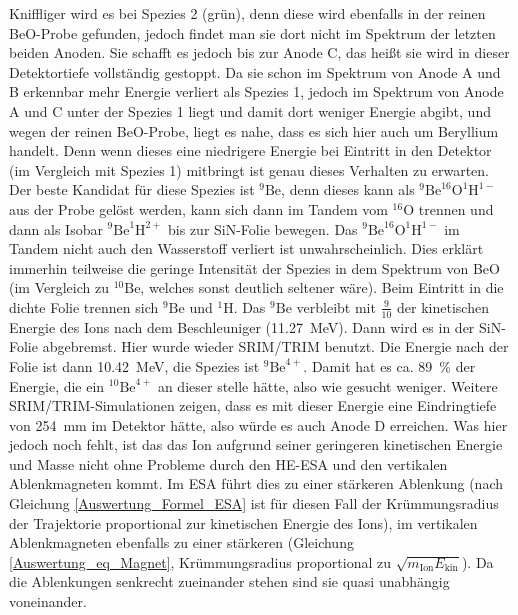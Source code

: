 Kniffliger wird es bei Spezies 2 (grün), denn diese wird ebenfalls in der reinen BeO-Probe gefunden, jedoch findet man sie dort nicht im Spektrum der letzten beiden Anoden.
Sie schafft es jedoch bis zur Anode C, das heißt sie wird in dieser Detektortiefe vollständig gestoppt.
Da sie schon im Spektrum von Anode A und B erkennbar mehr Energie verliert als Spezies 1, jedoch im Spektrum von Anode A und C unter der Spezies 1 liegt und damit dort weniger Energie abgibt, und wegen der reinen BeO-Probe, liegt es nahe, dass es sich hier auch um Beryllium handelt.
Denn wenn dieses eine niedrigere Energie bei Eintritt in den Detektor (im Vergleich mit Spezies 1) mitbringt ist genau dieses Verhalten zu erwarten.
Der beste Kandidat für diese Spezies ist $^{9}\text{Be}$, denn dieses kann als $^{9}\text{Be}^{16}\text{O}^{1}\text{H}^{1-}$ aus der Probe gelöst werden, kann sich dann im Tandem vom $^{16}\text{O}$ trennen und dann als Isobar $^{9}\text{Be}^{1}\text{H}^{2+}$ bis zur SiN-Folie bewegen.
Das $^{9}\text{Be}^{16}\text{O}^{1}\text{H}^{1-}$ im Tandem nicht auch den Wasserstoff verliert ist unwahrscheinlich.
Dies erklärt immerhin teilweise die geringe Intensität der Spezies in dem Spektrum von BeO (im Vergleich zu $^{10}\text{Be}$, welches sonst deutlich seltener wäre).
Beim Eintritt in die dichte Folie trennen sich $^{9}\text{Be}$ und $^{1}\text{H}$.
Das $^{9}\text{Be}$ verbleibt mit $\frac{9}{10}$ der kinetischen Energie des Ions nach dem Beschleuniger (\SI{11.27}{\mega\electronvolt}).
Dann wird es in der SiN-Folie abgebremst.
Hier wurde wieder SRIM/TRIM benutzt.
Die Energie nach der Folie ist dann \SI{10.42}{\mega\electronvolt}, die Spezies ist $^{9}\text{Be}^{4+}$.
Damit hat es ca. \SI{89}{\percent} der Energie, die ein $^{10}\text{Be}^{4+}$ an dieser stelle hätte, also wie gesucht weniger.
Weitere SRIM/TRIM-Simulationen zeigen, dass es mit dieser Energie eine Eindringtiefe von \SI{254}{\milli\metre} im Detektor hätte, also würde es auch Anode D erreichen.
Was hier jedoch noch fehlt, ist das das Ion aufgrund seiner geringeren kinetischen Energie und Masse nicht ohne Probleme durch den HE-ESA und den vertikalen Ablenkmagneten kommt.
Im ESA führt dies zu einer stärkeren Ablenkung (nach Gleichung \ref{Auswertung_Formel_ESA} ist für diesen Fall der Krümmungsradius der Trajektorie proportional zur kinetischen Energie des Ions), im vertikalen Ablenkmagneten ebenfalls zu einer stärkeren (Gleichung \ref{Auswertung_eq_Magnet}, Krümmungsradius proportional zu $\sqrt{m_{\text{Ion}}E_{\text{kin}}}$).
Da die Ablenkungen senkrecht zueinander stehen sind sie quasi unabhängig voneinander.
